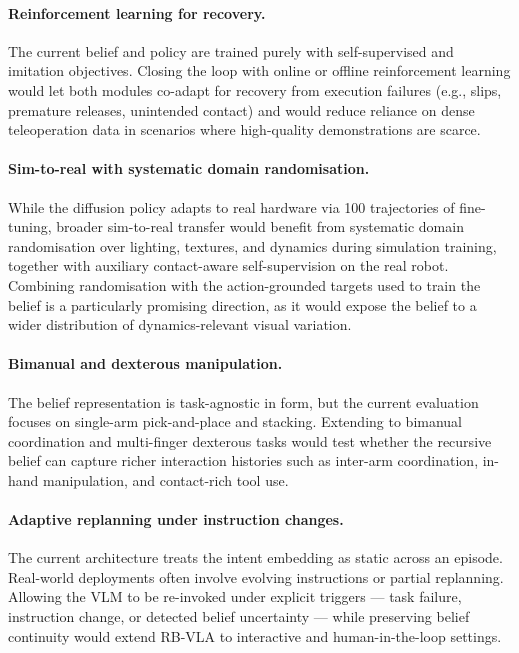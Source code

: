\documentclass[12pt]{article}
\begin{document}
\paragraph{Reinforcement learning for recovery.} The current belief and policy are trained purely with self-supervised and imitation objectives. Closing the loop with online or offline reinforcement learning would let both modules co-adapt for recovery from execution failures (e.g., slips, premature releases, unintended contact) and would reduce reliance on dense teleoperation data in scenarios where high-quality demonstrations are scarce.

\paragraph{Sim-to-real with systematic domain randomisation.} While the diffusion policy adapts to real hardware via 100 trajectories of fine-tuning, broader sim-to-real transfer would benefit from systematic domain randomisation over lighting, textures, and dynamics during simulation training, together with auxiliary contact-aware self-supervision on the real robot. Combining randomisation with the action-grounded targets used to train the belief is a particularly promising direction, as it would expose the belief to a wider distribution of dynamics-relevant visual variation.

\paragraph{Bimanual and dexterous manipulation.} The belief representation is task-agnostic in form, but the current evaluation focuses on single-arm pick-and-place and stacking. Extending to bimanual coordination and multi-finger dexterous tasks would test whether the recursive belief can capture richer interaction histories such as inter-arm coordination, in-hand manipulation, and contact-rich tool use.

\paragraph{Adaptive replanning under instruction changes.} The current architecture treats the intent embedding as static across an episode. Real-world deployments often involve evolving instructions or partial replanning. Allowing the VLM to be re-invoked under explicit triggers --- task failure, instruction change, or detected belief uncertainty --- while preserving belief continuity would extend RB-VLA to interactive and human-in-the-loop settings.
\end{document}
